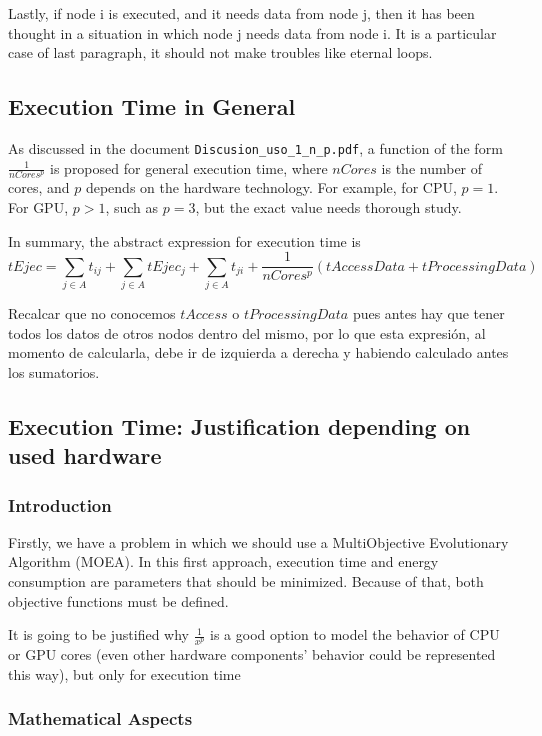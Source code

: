 \documentclass{article}
\begin{document}
Lastly, if node i is executed, and it needs data from node j, then it has been thought in a situation in which node j needs data from node i. It is a particular case of last paragraph, it should not make troubles like eternal loops.

\subsection{Execution Time in General}

As discussed in the document \texttt{Discusion\_uso\_1\_n\_p.pdf}, a function of the form $\frac{1}{nCores^p}$ is proposed for general execution time, where $nCores$ is the number of cores, and $p$ depends on the hardware technology. For example, for CPU, $p=1$. For GPU, $p>1$, such as $p=3$, but the exact value needs thorough study.

In summary, the abstract expression for execution time is
\[
tEjec = \sum_{j \in A} t_{ij} + \sum_{j \in A} tEjec_j + \sum_{j \in A} t_{ji} + \frac{1}{nCores^p}(tAccessData + tProcessingData)
\]

Recalcar que no conocemos \(tAccess\) o \(tProcessingData\) pues antes hay que tener todos los datos de otros nodos dentro del mismo, por lo que esta expresión, al momento de calcularla, debe ir de izquierda a derecha y habiendo calculado antes los sumatorios.

\subsection{Execution Time: Justification depending on used hardware}

\subsubsection{Introduction}

Firstly, we have a problem in which we should use a MultiObjective Evolutionary Algorithm (MOEA). In this first approach, execution time and energy consumption are parameters that should be minimized. Because of that, both objective functions must be defined.

It is going to be justified why $\frac{1}{{x^p}}$ is a good option to model the behavior of CPU or GPU cores (even other hardware components' behavior could be represented this way), but only for execution time

\subsubsection{Mathematical Aspects}
\end{document}
